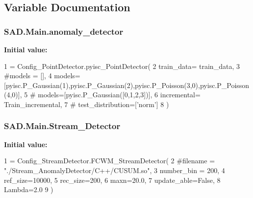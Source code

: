 \subsection{Variable Documentation}
\subsubsection[{\texorpdfstring{anomaly\+\_\+detector}{anomaly_detector}}]{\setlength{\rightskip}{0pt plus 5cm}S\+A\+D.\+Main.\+anomaly\+\_\+detector}\hypertarget{namespaceSAD_1_1Main_a6fae104012e304d1adde92108c00b261}{}\label{namespaceSAD_1_1Main_a6fae104012e304d1adde92108c00b261}
{\bfseries Initial value\+:}
\begin{DoxyCode}
1 = Config\_PointDetector.pyisc\_PointDetector(
2     train\_data= train\_data,
3     \textcolor{comment}{#models = [],}
4     models=[pyisc.P\_Gaussian(1),pyisc.P\_Gaussian(2),pyisc.P\_Poisson(3,0),pyisc.P\_Poisson(4,0)],
5     \textcolor{comment}{# models=[pyisc.P\_Gaussian([0,1,2,3])],}
6     incremental= Train\_incremental,
7     \textcolor{comment}{# test\_distribution=['norm']}
8 )
\end{DoxyCode}
\subsubsection[{\texorpdfstring{Stream\+\_\+\+Detector}{Stream_Detector}}]{\setlength{\rightskip}{0pt plus 5cm}S\+A\+D.\+Main.\+Stream\+\_\+\+Detector}\hypertarget{namespaceSAD_1_1Main_adedbb4deb28e6f7b98f42f21f1330352}{}\label{namespaceSAD_1_1Main_adedbb4deb28e6f7b98f42f21f1330352}
{\bfseries Initial value\+:}
\begin{DoxyCode}
1 = Config\_StreamDetector.FCWM\_StreamDetector(
2     \textcolor{comment}{#filename = "./Stream\_AnomalyDetector/C++/CUSUM.so",}
3     number\_bin = 200,
4     ref\_size=10000,
5     rec\_size=200,
6     maxn=20.0,
7     update\_able=\textcolor{keyword}{False},
8     Lambda=2.0
9 )
\end{DoxyCode}
